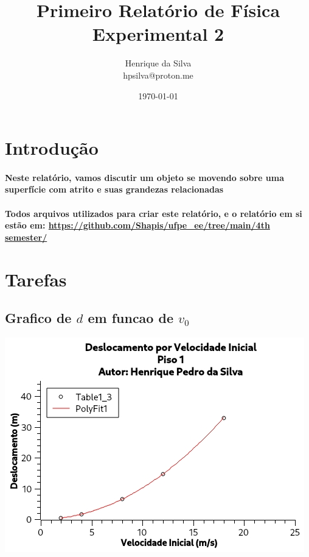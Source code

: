 \documentclass[12pt,twoside, a4paper, twocolumn]{article}
\title{Primeiro Relatório de Física Experimental 2}
\author{Henrique da Silva \\ hpsilva@proton.me}
\date{\today}
\begin{document}
\maketitle
{}
\newpage
\tableofcontents
\newpage

\section{Introdução}

\paragraph*{Neste relatório, vamos discutir um objeto se movendo sobre uma superfície com atrito e suas grandezas relacionadas}

\paragraph*{Todos arquivos utilizados para criar este relatório, e o relatório em si estão em:  \url{https://github.com/Shapis/ufpe_ee/tree/main/4th semester/}}

\section{Tarefas}

\subsection{Grafico de $d$ em funcao de $v_0$}



\begin{adjustbox}{scale=0.75}
    \includegraphics{Grafico-0.jpg}
\end{adjustbox}
\end{document}
